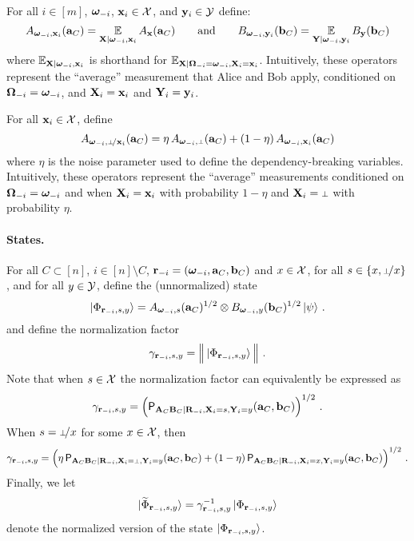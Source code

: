 For all $i \in [m]$, ${\boldsymbol{\omega}}_{-i}$, $\mathbf{x}_i \in \mathcal{X}$, and $\mathbf{y}_i \in \mathcal{Y}$ define:
\begin{equation}
\label{eq:states-operators-2}
 A_{{\boldsymbol{\omega}}_{-i}, \mathbf{x}_i}(\mathbf{a}_C) = \operatorname*{\mathbb{E}}_{\mathbf{X} | {\boldsymbol{\omega}}_{-i}, \mathbf{x}_i} A_{\mathbf{x}}(\mathbf{a}_C) \qquad \text{and} \qquad  B_{{\boldsymbol{\omega}}_{-i}, \mathbf{y}_i}(\mathbf{b}_C) = \operatorname*{\mathbb{E}}_{\mathbf{Y} | {\boldsymbol{\omega}}_{-i}, \mathbf{y}_i} B_{\mathbf{y}}(\mathbf{b}_C)
\end{equation}
where $\operatorname*{\mathbb{E}}_{\mathbf{X} | {\boldsymbol{\omega}}_{-i}, \mathbf{x}_i}$ is shorthand for $\operatorname*{\mathbb{E}}_{\mathbf{X} | {\boldsymbol{\Omega}}_{-i} = {\boldsymbol{\omega}}_{-i}, \mathbf{X}_i = \mathbf{x}_i}$. Intuitively, these operators represent the ``average'' measurement that Alice and Bob apply, conditioned on ${\boldsymbol{\Omega}}_{-i} = {\boldsymbol{\omega}}_{-i}$, and $\mathbf{X}_i = \mathbf{x}_i$ and $\mathbf{Y}_i = \mathbf{y}_i$. 

For all $\mathbf{x}_i \in \mathcal{X}$, define
\begin{equation}
\label{eq:states-operators-3}
	A_{\bomega_\mi,\dummy\!/\bx_i}(\ba_C) = \eta \, A_{\bomega_\mi,\dummy}(\ba_C) + (1 - \eta) \, A_{\bomega_\mi,\bx_i}(\ba_C) 
\end{equation}
where $\eta$ is the noise parameter used to define the dependency-breaking variables. Intuitively, these operators represent the ``average'' measurements conditioned on ${\boldsymbol{\Omega}}_{-i} = {\boldsymbol{\omega}}_{-i}$ and when $\mathbf{X}_i=\mathbf{x}_i$ with probability $1 - \eta$ and $\bX_i=\dummy$ with probability $\eta$. %

\paragraph{States.}  For all $C \subset [n]$, $i \in [n] \setminus C$, $\mathbf{r}_{-i} = ({\boldsymbol{\omega}}_{-i},\mathbf{a}_C,\mathbf{b}_C)$ and $x \in \mathcal{X}$, for all $s \in \{x,\dummyx\}$, and for all $y \in \mathcal{Y}$, define the (unnormalized) state
\[
	{|\Phi_{\mathbf{r}_{-i},s,y}\rangle} = A_{{\boldsymbol{\omega}}_{-i},s}(\mathbf{a}_C)^{1/2} \otimes B_{{\boldsymbol{\omega}}_{-i},y}(\mathbf{b}_C)^{1/2} \, {|\psi\rangle}~.
\]
and define the normalization factor
\[
	\gamma_{\mathbf{r}_{-i},s,y} = \Big \| \, {|\Phi_{\mathbf{r}_{-i},s,y}\rangle} \, \Big \|~.
\]
Note that when $s \in \mathcal{X}$ the normalization factor can equivalently be expressed as
\[
	\gamma_{\mathbf{r}_{-i},s,y} = \Big( \mathsf{P}_{\mathbf{A}_C \mathbf{B}_C | \mathbf{R}_{-i}, \mathbf{X}_i = s, \mathbf{Y}_i = y}(\mathbf{a}_C,\mathbf{b}_C) \Big)^{1/2}~.
\]
When $s = \dummyx$ for some $x \in \mathcal{X}$, then 
\[
	\gamma_{\br_\mi,s,y} = \Big( \eta \, \P_{\bA_C \bB_C | \bR_\mi, \bX_i = \dummy, \bY_i = y}(\ba_C,\bb_C) + (1 - \eta) \, \P_{\bA_C \bB_C | \bR_\mi, \bX_i = x, \bY_i = y}(\ba_C,\bb_C)\Big)^{1/2}~.
\]
Finally, we let
\[
	{|\widetilde{\Phi}_{\mathbf{r}_{-i},s,y}\rangle} = \gamma_{\mathbf{r}_{-i},s,y}^{-1} \, {|\Phi_{\mathbf{r}_{-i},s,y}\rangle}
\]
denote the normalized version of the state ${|\Phi_{\mathbf{r}_{-i},s,y}\rangle}$.

